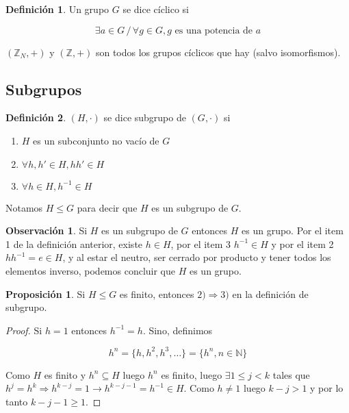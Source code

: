 \documentclass{article}
\theoremstyle{definition}
\newtheorem{defn}{Definici\'on}[subsection]
\newtheorem{prop}{Proposici\'on}[subsection]
\newtheorem{obs}{Observaci\'on}[subsection]
\begin{document}
\begin{defn}
Un grupo $G$ se dice c\'iclico si 

$$\exists a \in G \, / \, \forall g \in G, g\textrm{ es una potencia de }a$$
\end{defn}

$(\mathbb{Z}_N,+)$ y $(\mathbb{Z},+)$ son todos los grupos c\'iclicos que hay (salvo isomorfismos).

\subsection{Subgrupos}

\begin{defn}
$(H,\cdot)$ se dice subgrupo de $(G,\cdot)$ si

\begin{enumerate}
\item $H$ es un subconjunto no vac\'io de $G$
\item $\forall h, h' \in H, hh' \in H$
\item $\forall h \in H, h^{-1} \in H$
\end{enumerate}

Notamos $H \leq G$ para decir que $H$ es un subgrupo de $G$.
\end{defn}

\begin{obs}
Si $H$ es un subgrupo de $G$ entonces $H$ es un grupo. Por el item 1 de la definici\'on anterior, existe $h \in H$, por el item 3 $h^{-1} \in H$ y por el item 2 $hh^{-1} = e \in H$, y al estar el neutro, ser cerrado por producto y tener todos los elementos inverso, podemos concluir que $H$ es un grupo.
\end{obs}

\begin{prop}
Si $H \leq G$ es finito, entonces $2) \Rightarrow 3)$ en la definici\'on de subgrupo.
\end{prop}

\begin{proof}
Si $h = 1$ entonces $h^{-1} = h$. Sino, definimos 

$$h^n = \{h,h^2,h^3, \dots\} = \{h^n, n \in \mathbb{N}\}$$

Como $H$ es finito y $h^n \subseteq H$ luego $h^n$ es finito, luego $\exists 1 \leq j < k$ tales que $h^j = h^k \Rightarrow h^{k-j} = 1 \rightarrow h^{k-j-1} = h^{-1} \in H$. Como $h \neq 1$ luego $k-j > 1$ y por lo tanto $k-j-1 \geq 1$.
\end{proof}
\end{document}

